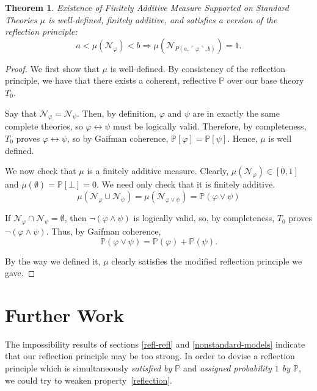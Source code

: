 \documentclass[12pt]{article}
\newcommand{\PP}{\mathbb{P}}
\theoremstyle{plain}
\newtheorem{theorem}{Theorem}[subsection]
\theoremstyle{definition}
\theoremstyle{remark}
\begin{document}
\begin{theorem} \emph{Existence of Finitely Additive Measure Supported on Standard Theories}
$\mu$ is well-defined, finitely additive, and satisfies a version of the reflection principle:
$$a < \mu(\mathcal{N}_{\varphi}) < b \Rightarrow \mu(\mathcal{N}_{P( a, \ulcorner \varphi \urcorner, b)}) = 1.$$
\end{theorem}
\begin{proof}
We first show that $\mu$ is well-defined. By consistency of the reflection principle, we have that there exists a coherent, reflective $\mathbb{P}$ over our base theory $T_0$.

Say that $\mathcal{N}_{\varphi}=\mathcal{N}_{\psi}$. Then, by definition, $\varphi$ and $\psi$ are in exactly the same complete theories, so $\varphi\leftrightarrow\psi$ must be logically valid. Therefore, by completeness, $T_0$ proves $\varphi\leftrightarrow\psi$, so by Gaifman coherence, $\mathbb{P}[\varphi]=\mathbb{P}[\psi]$. Hence, $\mu$ is well defined.

We now check that $\mu$ is a finitely additive measure. Clearly, $\mu(\mathcal{N}_{\varphi})\in[0,1]$ and $\mu(\emptyset)=\mathbb{P}[\bot]=0$.
We need only check that it is finitely additive.
$$\mu(\mathcal{N}_{\varphi}\cup \mathcal{N}_{\psi})=\mu(\mathcal{N}_{\varphi\vee\psi})=\mathbb{P}(\varphi\vee\psi)$$

If $\mathcal{N}_{\varphi}\cap \mathcal{N}_{\psi}=\emptyset$, then $\neg(\varphi\wedge\psi)$ is logically valid, so, by completeness, $T_0$ proves $\neg(\varphi\wedge\psi)$. Thus, by Gaifman coherence,
$$\mathbb{P}(\varphi\vee\psi)=\mathbb{P}(\varphi)+\mathbb{P}(\psi).$$

By the way we defined it, $\mu$ clearly satisfies the modified reflection principle we gave.
\end{proof}

\section{Further Work}
\label{further-work}

The impossibility results of sections \ref{refl-refl} and \ref{nonstandard-models} indicate that our reflection principle may be too strong.
In order to devise a reflection principle which is simultaneously \emph{satisfied by $\PP$}
and \emph{assigned probability $1$ by $\PP$},
we could try to weaken property~\ref{reflection}.
\end{document}
